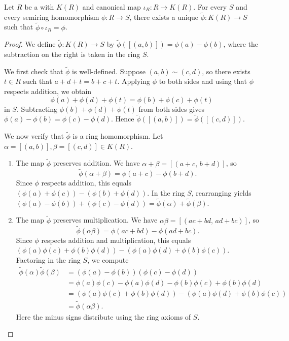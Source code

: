 \begin{theorem} \label{theorem:grothendieck_ring_universal_property}
Let $R$ be a  with  $K(R)$ and canonical map $\iota_R: R \to K(R)$. For every  $S$ and every semiring homomorphism $\phi: R \to S$, there exists a unique  $\widetilde{\phi}: K(R) \to S$ such that $\widetilde{\phi} \circ \iota_R = \phi$.
\end{theorem}

\begin{proof}
We define $\widetilde{\phi}: K(R) \to S$ by $\widetilde{\phi}([(a,b)]) = \phi(a) - \phi(b)$, where the subtraction on the right is taken in the ring $S$.

We first check that $\widetilde{\phi}$ is well-defined. Suppose $(a,b) \sim (c,d)$, so there exists $t \in R$ such that $a + d + t = b + c + t$. Applying $\phi$ to both sides and using that $\phi$ respects addition, we obtain
$$\phi(a) + \phi(d) + \phi(t) = \phi(b) + \phi(c) + \phi(t)$$
in $S$. Subtracting $\phi(b) + \phi(d) + \phi(t)$ from both sides gives $\phi(a) - \phi(b) = \phi(c) - \phi(d)$. Hence $\widetilde{\phi}([(a,b)]) = \widetilde{\phi}([(c,d)])$.

We now verify that $\widetilde{\phi}$ is a ring homomorphism. Let $\alpha = [(a,b)], \beta = [(c,d)] \in K(R)$.

\begin{enumerate}
    \item The map $\widetilde{\phi}$ preserves addition. We have $\alpha + \beta = [(a+c,\, b+d)]$, so
    $$\widetilde{\phi}(\alpha + \beta) = \phi(a+c) - \phi(b+d).$$
    Since $\phi$ respects addition, this equals $(\phi(a) + \phi(c)) - (\phi(b) + \phi(d))$. In the ring $S$, rearranging yields $(\phi(a) - \phi(b)) + (\phi(c) - \phi(d)) = \widetilde{\phi}(\alpha) + \widetilde{\phi}(\beta)$.

    \item The map $\widetilde{\phi}$ preserves multiplication. We have $\alpha \beta = [(ac + bd,\, ad + bc)]$, so
    $$\widetilde{\phi}(\alpha \beta) = \phi(ac + bd) - \phi(ad + bc).$$
    Since $\phi$ respects addition and multiplication, this equals $(\phi(a)\phi(c) + \phi(b)\phi(d)) - (\phi(a)\phi(d) + \phi(b)\phi(c))$. Factoring in the ring $S$, we compute
    \begin{align*}
    \widetilde{\phi}(\alpha)\widetilde{\phi}(\beta) &= (\phi(a) - \phi(b))(\phi(c) - \phi(d)) \\
    &= \phi(a)\phi(c) - \phi(a)\phi(d) - \phi(b)\phi(c) + \phi(b)\phi(d) \\
    &= (\phi(a)\phi(c) + \phi(b)\phi(d)) - (\phi(a)\phi(d) + \phi(b)\phi(c)) \\
    &= \widetilde{\phi}(\alpha \beta).
    \end{align*}
    Here the minus signs distribute using the ring axioms of $S$.


\end{enumerate}
\end{proof}
